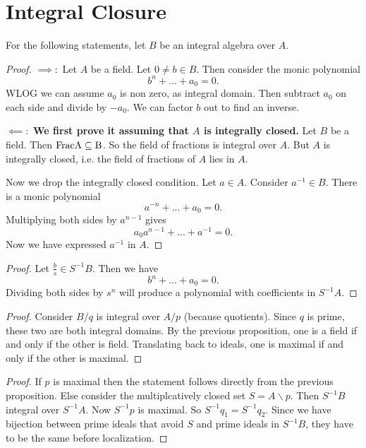 \section{Integral Closure}

For the following statements, let $B$ be an integral algebra over $A$. 
\begin{proof}
    $\implies: $ Let $A$ be a field. Let $0\neq b\in B$. Then consider the monic polynomial \[
    b^n + ... +a_0 =0.
    \]
    WLOG we can assume $a_0$ is non zero, as integral domain. Then subtract $a_0$ on each side and divide by $-a_0$. We can factor $b$ out to find an inverse.
    
    $\impliedby:$ 
    \textbf{We first prove it assuming that $A$ is integrally closed.}
    Let $B$ be a field. Then $\rm{Frac} A\subseteq B$. So the field of fractions is integral over $A$. But $A$ is integrally closed, i.e. the field of fractions of $A$ lies in $A$. 


    Now we drop the integrally closed condition. Let $a\in A$. Consider $a^{-1}\in B$. There is a monic polynomial \[
    a^{-n}+ ... + a_0 =0.
    \]
    Multiplying both sides by $a^{n-1}$ gives \[
    a_0 a^{n-1} + ... + a^{-1}=0.
    \]
    Now we have expressed $a^{-1}$ in $A$.
\end{proof}
\begin{proof}
    Let $\frac{b}{s}\in S^{-1}B$.
    Then we have \[
    b^n + ... +a_0=0.
    \]
    Dividing both sides by $s^n$ will produce a polynomial with coefficients in $S^{-1}A$.
\end{proof}
\begin{proof}
    Consider $B/q$ is integral over $A/p$ (because quotients). Since $q$ is prime, these two are both integral domains. By the previous proposition, one is a field if and only if the other is field. Translating back to ideals, one is maximal if and only if the other is maximal.
\end{proof}

\begin{proof}
    If $p$ is maximal then the statement follows directly from the previous proposition. Else consider the multiplcatively closed set $S=A \backslash p$. Then $S^{-1}B$ integral over $S^{-1} A$. Now $S^{-1}p$ is maximal. So $S^{-1}q_1=S^{-1}q_2$. Since we have bijection between prime ideals that avoid $S$ and prime ideals in $S^{-1}B$, they have to be the same before localization.
\end{proof}

